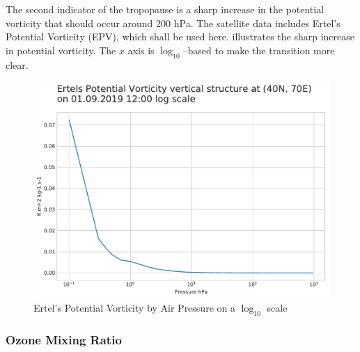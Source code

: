 \documentclass[../00_main.tex]{subfiles}
\begin{document}
The second indicator of the tropopause is a sharp increase in the potential
vorticity that should occur around 200 hPa. The satellite data includes Ertel's
Potential Vorticity (EPV), which shall be used here.  illustrates 
the sharp increase in potential vorticity. The $x$ axis is $\log_{10}$--based to
make the transition more clear.
\begin{figure}[H]
\center
    \includegraphics[width=\textwidth]{../graphics/epv_log}
    \vspace{-20pt}
    \caption{Ertel's Potential Vorticity by Air Pressure on a $\log_{10}$ scale}
    \label{epv}
\end{figure}

\subsubsection{Ozone Mixing Ratio}
\end{document}
